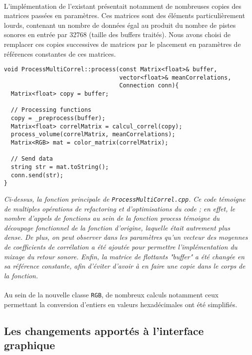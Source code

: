 \paragraph{}
L'implémentation de l'existant présentait notamment de nombreuses
copies des matrices passées en paramètres. Ces matrices sont des
éléments particulièrement lourds, contenant un nombre de données égal
au produit du nombre de pistes sonores en entrée par 32768 (taille des
buffers traités). Nous avons choisi de remplacer ces copies
successives de matrices par le placement en paramètres de références
constantes de ces matrices.

\begin{lstlisting}
void ProcessMultiCorrel::process(const Matrix<float>& buffer,
                                 vector<float>& meanCorrelations,
                                 Connection conn){
  Matrix<float> copy = buffer;

  // Processing functions
  copy = _preprocess(buffer);
  Matrix<float> correlMatrix = calcul_correl(copy);
  process_volume(correlMatrix, meanCorrelations);
  Matrix<RGB> mat = color_matrix(correlMatrix);

  // Send data
  string str = mat.toString();
  conn.send(str);
}
\end{lstlisting}
\begin{center}
 \textit{Ci-dessus, la fonction principale de
  \verb!ProcessMultiCorrel.cpp!. Ce code témoigne de multiples
  opérations de refactoring et d'optimisations du code ; en effet,
  le nombre d'appels de fonctions au sein de la fonction process témoigne du
  découpage fonctionnel de la fonction d'origine, laquelle était autrement
  plus dense. De plus, on peut observer dans les paramètres qu'un
  vecteur des moyennes de coefficients de corrélation a été ajoutée
  pour permettre l'implémentation du mixage du retour sonore. Enfin,
  la matrice de flottants "buffer" a été changée en sa référence
  constante, afin d'éviter d'avoir à en faire une copie dans le
 corps de la fonction.}
\end{center}

\paragraph{}
Au sein de la nouvelle classe \verb!RGB!, de nombreux calculs notamment ceux permettant la conversion d'entiers en valeurs hexadécimales ont été simplifiés.

\subsection{Les changements apportés à l'interface graphique}
